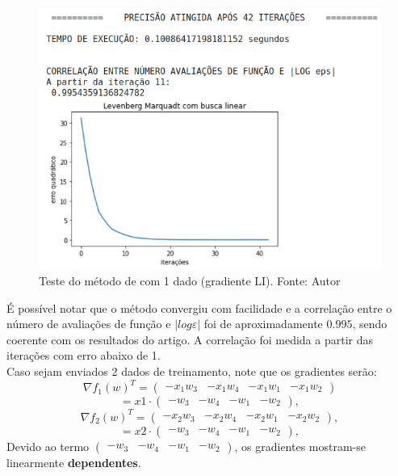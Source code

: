 \documentclass[11pt]{article}
\begin{document}
\begin{figure}[H]
\center
\includegraphics[scale=0.5]{Figuras/lmbl1.png}
\caption{Teste do método de \cite{bmLS} com 1 dado (gradiente LI). Fonte: Autor} 
\label{lmbl1}
\end{figure}

É possível notar que o método convergiu com facilidade e a correlação entre o número de avaliações de função e $|log \varepsilon|$ foi de aproximadamente $0.995$, sendo coerente com os resultados do artigo. A correlação foi medida a partir das iterações com erro abaixo de 1.\\

Caso sejam enviados 2 dados de treinamento, note que os gradientes serão:
$$\nabla f_1(w)^T = \begin{pmatrix}-x_1 w_3 & -x_1 w_4 & -x_1 w_1 & -x_1 w_2  \end{pmatrix}$$
$$ = x1 \cdot \begin{pmatrix}-w_3 & -w_4 & -w_1 & - w_2  \end{pmatrix},$$
$$\nabla f_2(w)^T = \begin{pmatrix}-x_2 w_3 & -x_2 w_4 & -x_2 w_1 & -x_2 w_2  \end{pmatrix},$$
$$ = x2 \cdot \begin{pmatrix}-w_3 & -w_4 & -w_1 & - w_2  \end{pmatrix},$$
Devido ao termo $\begin{pmatrix}-w_3 & -w_4 & -w_1 & - w_2  \end{pmatrix}$, os gradientes mostram-se linearmente \textbf{dependentes}.
\end{document}
